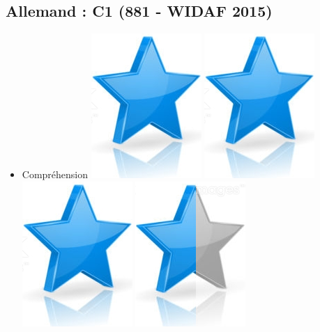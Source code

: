 \documentclass[10pt,a4paper,sans]{article}
\begin{document}
\begin{minipage}[t]{0.28\textwidth}
\begin{mdframed}[style=cadreCompetences]
        \subsection{Allemand : C1 \newline (881 - WIDAF 2015)}
            \begin{itemize}
                \item{Compréhension
                    \hfill
                    \includegraphics[scale=0.20]{img/star.png} \hspace{-0.2cm}
                    \includegraphics[scale=0.20]{img/star.png} \hspace{-0.2cm}
                    \includegraphics[scale=0.20]{img/star.png} \hspace{-0.2cm}
                    \includegraphics[scale=0.20]{img/half_star.png} \hspace{-0.2cm}
}
\end{itemize}
\end{mdframed}
\end{minipage}
\end{document}
